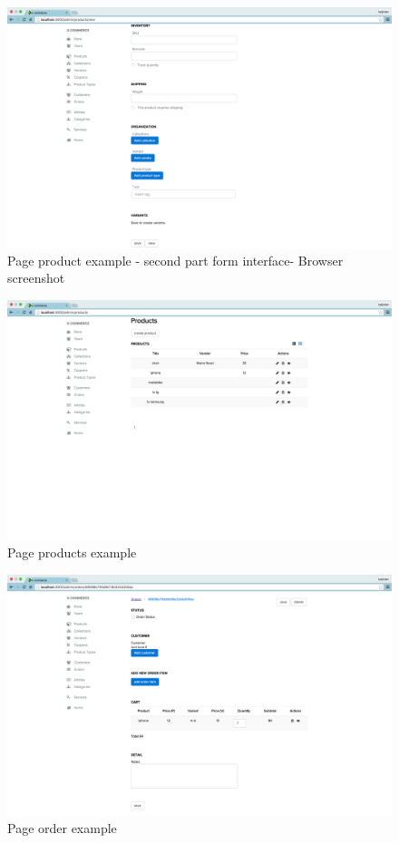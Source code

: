 \begin{figure}[htb]
\centering
\includegraphics[width=1.0\linewidth]{images/chapter4/prod-part2-all.png}\hfill
\caption[page product second part form browser]{Page product example - second part form interface- Browser screenshot}
\label{fig:design_page}
\end{figure}
\begin{figure}[htb]
\centering
\includegraphics[width=1.0\linewidth]{images/chapter4/page-products-all.png}\hfill
\caption[page products example]{Page products example}
\label{fig:design_page}
\end{figure}
\begin{figure}[htb]
\centering
\includegraphics[width=1.0\linewidth]{images/chapter4/page-order-all.png}\hfill
\caption[page order example]{Page order example}
\label{fig:design_page}
\end{figure}
